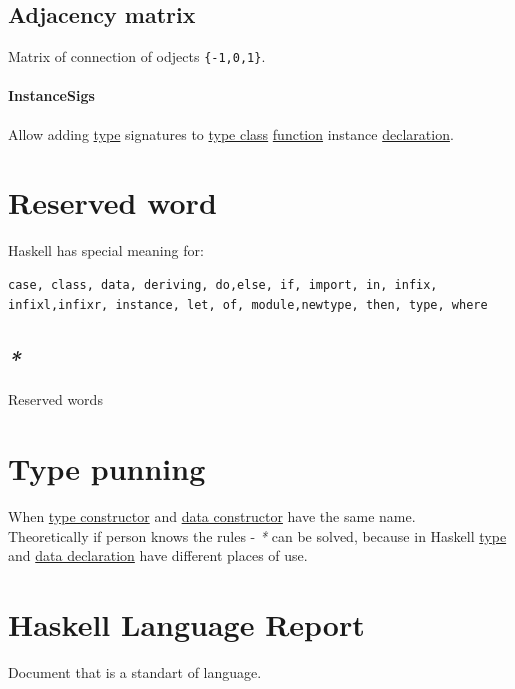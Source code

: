 \documentclass[a4paper,14pt,oneside]{book}
\begin{document}
\section{\label{orge7bc99a}Adjacency matrix}
\label{sec:org0e97f71}
Matrix of connection of odjects \texttt{\{-1,0,1\}}.\\

\subsubsection{\label{org4e41654}InstanceSigs}
\label{sec:orgf407c68}
Allow adding \hyperref[orgc4a7610]{type} signatures to \hyperref[orgf587b3a]{type class} \hyperref[orge00b05b]{function} instance \hyperref[org818234c]{declaration}.\\


\chapter{\label{orgc9943db}Reserved word}
\label{sec:org69aa3d8}
Haskell has special meaning for:\\
\begin{verbatim}
case, class, data, deriving, do,else, if, import, in, infix, infixl,infixr, instance, let, of, module,newtype, then, type, where
\end{verbatim}

\section{\emph{*}}
\label{sec:org4a1edc4}
\label{org0331e3b}Reserved words\\

\chapter{\label{org51a427b}Type punning}
\label{sec:org8504363}
When \hyperref[orgb4f949a]{type constructor} and \hyperref[orgca305a4]{data constructor} have the same name.\\

Theoretically if person knows the rules - \emph{*} can be solved, because in Haskell \hyperref[orgc4a7610]{type} and \hyperref[org5f317de]{data declaration} have different places of use.\\

\chapter{\label{org0f85dea}Haskell Language Report}
\label{sec:org334c491}
Document that is a standart of language.\\
\end{document}

